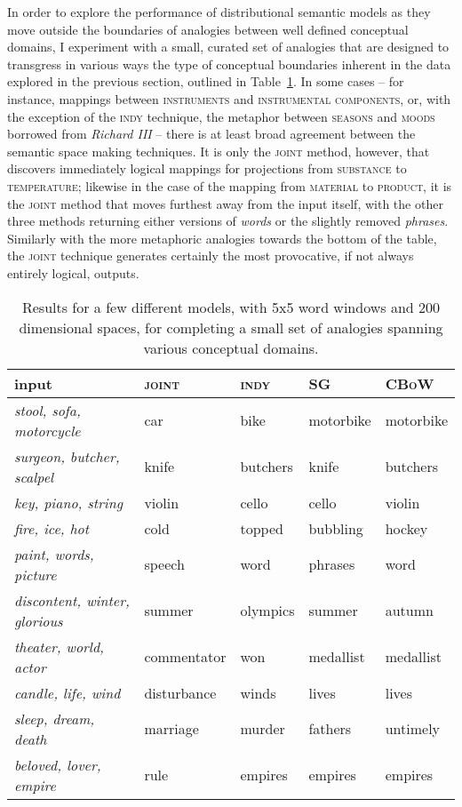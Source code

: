 In order to explore the performance of distributional semantic models as they move outside the boundaries of analogies between well defined conceptual domains, I experiment with a small, curated set of analogies that are designed to transgress in various ways the type of conceptual boundaries inherent in the data explored in the previous section, outlined in Table~\ref{tab:transgressions}.  In some cases -- for instance, mappings between \textsc{instruments} and \textsc{instrumental components}, or, with the exception of the \textsc{indy} technique, the metaphor between \textsc{seasons} and \textsc{moods} borrowed from \emph{Richard III} -- there is at least broad agreement between the semantic space making techniques.  It is only the \textsc{joint} method, however, that discovers immediately logical mappings for projections from \textsc{substance} to \textsc{temperature}; likewise in the case of the mapping from \textsc{material} to \textsc{product}, it is the \textsc{joint} method that moves furthest away from the input itself, with the other three methods returning either versions of \emph{words} or the slightly removed \emph{phrases}.  Similarly with the more metaphoric analogies towards the bottom of the table, the \textsc{joint} technique generates certainly the most provocative, if not always entirely logical, outputs.

\begin{table}
\centering
\begin{tabular}{l|llll}
\hline
input & \textsc{joint} & \textsc{indy} & \textsc{SG} & \textsc{CBoW} \\
\hline
\emph{stool, sofa, motorcycle} & car & bike & motorbike & motorbike \\
\emph{surgeon, butcher, scalpel} & knife & butchers & knife & butchers \\
\emph{key, piano, string} & violin & cello & cello & violin \\
\emph{fire, ice, hot} & cold & topped & bubbling & hockey \\
\emph{paint, words, picture} & speech & word & phrases & word \\
\emph{discontent, winter, glorious} & summer & olympics & summer & autumn \\
\emph{theater, world, actor} & commentator & won & medallist & medallist \\
\emph{candle, life, wind} & disturbance & winds & lives & lives \\
\emph{sleep, dream, death} & marriage & murder & fathers & untimely \\
\emph{beloved, lover, empire} & rule & empires & empires & empires \\
\hline
\end{tabular}
\caption[Transgressive Analogies]{Results for a few different models, with 5x5 word windows and 200 dimensional spaces, for completing a small set of analogies spanning various conceptual domains.}
\label{tab:transgressions}
\end{table}

